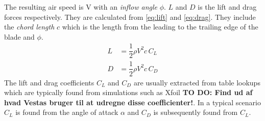 The resulting air speed is V with an \textit{inflow angle} $ \phi $. $ L $ and $ D $ is the lift and drag forces respectively. They are calculated from \cref{eq:lift} and \cref{eq:drag}. They include the \textit{chord length} $ c $ which is the length from the leading to the trailing edge of the blade and $ \phi $.
\begin{align}\label{eq:lift}
	L &= \dfrac{1}{2} \rho V^2 c \, C_L \\
	D &= \dfrac{1}{2} \rho V^2 c \, C_D
\end{align}
The lift and drag coefficients $ C_L $ and $ C_D $ are usually extracted from table lookups which are typically found from simulations such as Xfoil \textbf{TO DO: Find ud af hvad Vestas bruger til at udregne disse coefficienter!}. In a typical scenario $ C_L $ is found from the angle of attack $ \alpha $ and $ C_D $ is subsequently found from $ C_L $.